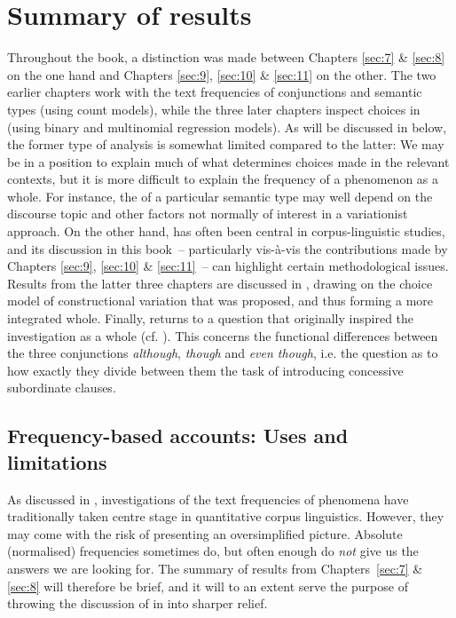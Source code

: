 \section{\label{bkm:Ref502620948}Summary of results}\label{sec:12.1}

Throughout the book, a distinction was made between Chapters \ref{sec:7} \& \ref{sec:8} on the one hand and Chapters \ref{sec:9}, \ref{sec:10} \& \ref{sec:11} on the other. The two earlier chapters work with the text frequencies of conjunctions and semantic types (using count models), while the three later chapters inspect choices in  (using binary and multinomial regression models). As will be discussed in  below, the former type of analysis is somewhat limited compared to the latter: We may be in a position to explain much of what determines choices made in the relevant contexts, but it is more difficult to explain the frequency of a phenomenon as a whole. For instance, the  of a particular semantic type may well depend on the discourse topic and other factors not normally of interest in a variationist approach. On the other hand,  has often been central in corpus-linguistic studies, and its discussion in this book~– particularly vis-à-vis the contributions made by Chapters \ref{sec:9}, \ref{sec:10} \& \ref{sec:11}~– can highlight certain methodological issues. Results from the latter three chapters are discussed in , drawing on the choice model of constructional variation that was proposed, and thus forming a more integrated whole. Finally,  returns to a question that originally inspired the investigation as a whole (cf. \citealt{Schützler2018c}). This concerns the functional differences between the three conjunctions \textit{although}, \textit{though} and \textit{even though}, i.e. the question as to how exactly they divide between them the task of introducing concessive subordinate clauses.

\subsection{\label{bkm:Ref80357338}Frequency-based accounts: Uses and limitations}\label{sec:12.1.1}

As discussed in , investigations of the text frequencies of phenomena have traditionally taken centre stage in quantitative corpus linguistics. However, they may come with the risk of presenting an oversimplified picture. Absolute (normalised) frequencies sometimes do, but often enough do \textit{not} give us the answers we are looking for. The summary of results from Chapters~\ref{sec:7} \& \ref{sec:8} will therefore be brief, and it will to an extent serve the purpose of throwing the discussion of  in  into sharper relief.

